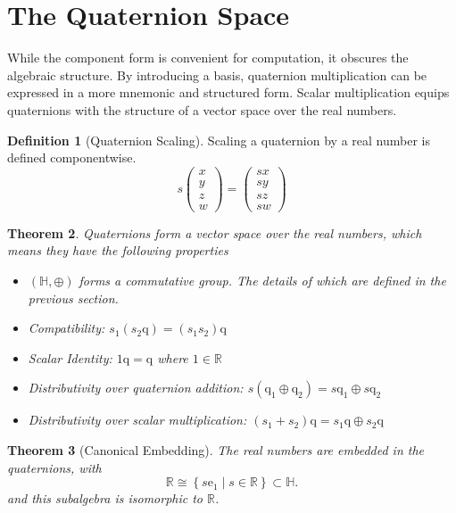 \documentclass{amsart}
\newtheorem{theorem}{Theorem}[section]
\theoremstyle{definition}
\newtheorem{definition}[theorem]{Definition}
\theoremstyle{remark}
\numberwithin{equation}{section}
\begin{document}
\section{The Quaternion Space}
While the component form is convenient for computation, it obscures the algebraic structure.
By introducing a basis, quaternion multiplication can be expressed in a more mnemonic and structured form.
Scalar multiplication equips quaternions with the structure of a vector space over the real numbers.
\begin{definition}[Quaternion Scaling]
  Scaling a quaternion by a real number is defined componentwise.
  \begin{equation}
    s
    \begin{pmatrix}
      x \\
      y \\
      z \\
      w
    \end{pmatrix} =
    \begin{pmatrix}
      sx \\
      sy \\
      sz \\
      sw
    \end{pmatrix}
  \end{equation}
\end{definition}

\begin{theorem}
  Quaternions form a vector space over the real numbers, which means they have the following properties
  \begin{itemize}
  \item $(\mathbb{H}, \oplus)$ forms a commutative group.
    The details of which are defined in the previous section.
  \item Compatibility: $s_1(s_2\mathrm{q}) = (s_1s_2)\mathrm{q}$
  \item Scalar Identity: $1\mathrm{q} = \mathrm{q}$ where $1\in\mathbb{R}$
  \item Distributivity over quaternion addition: $s(\mathrm{q}_1 \oplus \mathrm{q}_2) = s\mathrm{q}_1 \oplus s\mathrm{q}_2$
  \item Distributivity over scalar multiplication: $(s_1+ s_2) \mathrm{q} = s_1\mathrm{q} \oplus s_2\mathrm{q}$
  \end{itemize}
\end{theorem}

\begin{theorem}[Canonical Embedding]
  The real numbers are embedded in the quaternions, with
  \begin{equation}
    \mathbb{R} \cong \left\{ s\mathrm{e}_1 \mid s\in \mathbb{R} \right\} \subset \mathbb{H}.
  \end{equation}
  and this subalgebra is isomorphic to $\mathbb{R}$.
\end{theorem}
\end{document}
